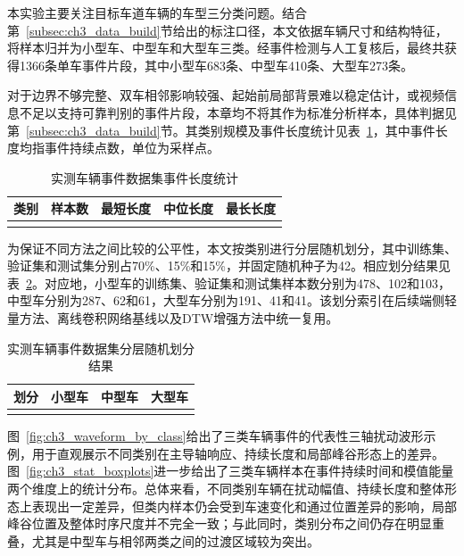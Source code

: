 \documentclass{xdupgthesis}
\begin{document}
本实验主要关注目标车道车辆的车型三分类问题。结合第~\ref{subsec:ch3_data_build}节给出的标注口径，本文依据车辆尺寸和结构特征，将样本归并为小型车、中型车和大型车三类。经事件检测与人工复核后，最终共获得1366条单车事件片段，其中小型车683条、中型车410条、大型车273条。

对于边界不够完整、双车相邻影响较强、起始前局部背景难以稳定估计，或视频信息不足以支持可靠判别的事件片段，本章均不将其作为标准分析样本，具体判据见第~\ref{subsec:ch3_data_build}节。其类别规模及事件长度统计见表~\ref{tab:ch3_dataset_stats}，其中事件长度均指事件持续点数，单位为采样点。

\begin{table}[!htbp]
\centering
{}
\caption{实测车辆事件数据集事件长度统计}
\label{tab:ch3_dataset_stats}
\setlength{\tabcolsep}{4pt}
\renewcommand{\arraystretch}{1.15}
\begin{tabular}{c c c c c}
\toprule
类别 & 样本数 & 最短长度 & 中位长度 & 最长长度 \\
\midrule
\\
\bottomrule
\end{tabular}
\end{table}

为保证不同方法之间比较的公平性，本文按类别进行分层随机划分，其中训练集、验证集和测试集分别占70\%、15\%和15\%，并固定随机种子为42。相应划分结果见表~\ref{tab:ch3_dataset_split}。对应地，小型车的训练集、验证集和测试集样本数分别为478、102和103，中型车分别为287、62和61，大型车分别为191、41和41。该划分索引在后续端侧轻量方法、离线卷积网络基线以及DTW增强方法中统一复用。

\begin{table}[!htbp]
\centering
{}
\caption{实测车辆事件数据集分层随机划分结果}
\label{tab:ch3_dataset_split}
\setlength{\tabcolsep}{6pt}
\renewcommand{\arraystretch}{1.15}
\begin{tabular}{c c c c}
\toprule
划分 & 小型车 & 中型车 & 大型车 \\
\midrule
\\
\bottomrule
\end{tabular}
\end{table}

图~\ref{fig:ch3_waveform_by_class}给出了三类车辆事件的代表性三轴扰动波形示例，用于直观展示不同类别在主导轴响应、持续长度和局部峰谷形态上的差异。图~\ref{fig:ch3_stat_boxplots}进一步给出了三类车辆样本在事件持续时间和模值能量两个维度上的统计分布。总体来看，不同类别车辆在扰动幅值、持续长度和整体形态上表现出一定差异，但类内样本仍会受到车速变化和通过位置差异的影响，局部峰谷位置及整体时序尺度并不完全一致；与此同时，类别分布之间仍存在明显重叠，尤其是中型车与相邻两类之间的过渡区域较为突出。
\end{document}

